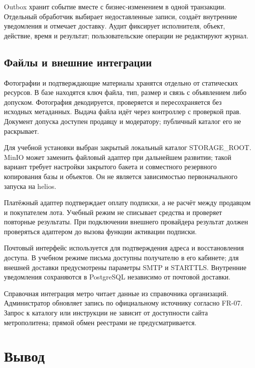Outbox хранит событие вместе с бизнес-изменением в одной транзакции. Отдельный обработчик выбирает недоставленные записи, создаёт внутренние уведомления и отмечает доставку. Аудит фиксирует исполнителя, объект, действие, время и результат; пользовательские операции не редактируют журнал.

\FloatBarrier
{}
\subsection{Файлы и внешние интеграции}

Фотографии и подтверждающие материалы хранятся отдельно от статических ресурсов. В базе находятся ключ файла, тип, размер и связь с объявлением либо допуском. Фотография декодируется, проверяется и пересохраняется без исходных метаданных. Выдача файла идёт через контроллер с проверкой прав. Документ допуска доступен продавцу и модератору; публичный каталог его не раскрывает.

Для учебной установки выбран закрытый локальный каталог STORAGE\_\allowbreak{}ROOT. Min\allowbreak{}IO может заменить файловый адаптер при дальнейшем развитии; такой вариант требует настройки закрытого бакета и совместного резервного копирования базы и объектов. Он не является зависимостью первоначального запуска на helios.

Платёжный адаптер подтверждает оплату подписки, а не расчёт между продавцом и покупателем лота. Учебный режим не списывает средства и проверяет повторные результаты. При подключении внешнего провайдера результат должен проверяться адаптером до вызова функции активации подписки.

Почтовый интерфейс используется для подтверждения адреса и восстановления доступа. В учебном режиме письма доступны получателю в его кабинете; для внешней доставки предусмотрены параметры SMTP и STARTTLS. Внутренние уведомления сохраняются в Postgre\allowbreak{}SQL независимо от почтовой доставки.

Справочная интеграция метро читает данные из справочника организаций. Администратор обновляет запись по официальному источнику согласно FR-07. Запрос к каталогу или инструкции не зависит от доступности сайта метрополитена; прямой обмен реестрами не предусматривается.

\clearpage
\section*{Вывод}
{}

